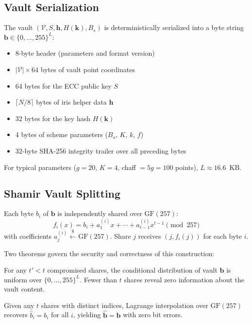 \subsection{Vault Serialization}
\label{sec:vault_serial}

The vault $(\mathcal{V}, S, \mathbf{h}, H(\mathbf{k}), B_s)$ is deterministically
serialized into a byte string $\mathbf{b} \in \{0, \ldots, 255\}^L$:
\begin{itemize}
  \item 8-byte header (parameters and format version)
  \item $|\mathcal{V}| \times 64$ bytes of vault point coordinates
  \item 64 bytes for the ECC public key $S$
  \item $\lceil N/8 \rceil$ bytes of iris helper data $\mathbf{h}$
  \item 32 bytes for the key hash $H(\mathbf{k})$
  \item 4 bytes of scheme parameters ($B_s$, $K$, $k$, $f$)
  \item 32-byte SHA-256 integrity trailer over all preceding bytes
\end{itemize}
For typical parameters ($g = 20$, $K = 4$, chaff $= 5g = 100$ points),
$L \approx 16.6$~KB.

\subsection{Shamir Vault Splitting}
\label{sec:shamir_splitting}

Each byte $b_i$ of $\mathbf{b}$ is independently shared over $\mathrm{GF}(257)$:
\begin{equation}
  f_i(x) = b_i + a_1^{(i)} x + \cdots + a_{t-1}^{(i)} x^{t-1} \pmod{257}
\end{equation}
with coefficients $a_j^{(i)} \stackrel{\$}{\leftarrow} \mathrm{GF}(257)$.
Share $j$ receives $(j, f_i(j))$ for each byte $i$.

Two theorems govern the security and correctness of this construction:

\begin{mytherm}
For any $t' < t$ compromised shares, the conditional distribution of vault
$\mathbf{b}$ is uniform over $\{0, \ldots, 255\}^L$. Fewer than $t$ shares
reveal zero information about the vault content.
\end{mytherm}

\begin{mytherm}
\label{thm:exact_recon}
Given any $t$ shares with distinct indices, Lagrange interpolation over
$\mathrm{GF}(257)$ recovers $\hat{b}_i = b_i$ for all $i$, yielding
$\hat{\mathbf{b}} = \mathbf{b}$ with zero bit errors.
\end{mytherm}

